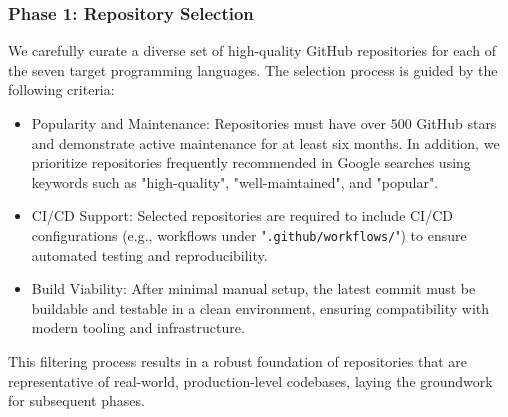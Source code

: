 \documentclass[11pt, a4paper, logo, copyright, nonumbering]{seed}
\begin{document}

\subsubsection{Phase 1: Repository Selection}
\label{sec:phase1_repository_selection}

We carefully curate a diverse set of high-quality GitHub repositories for each of the seven target programming languages. 
The selection process is guided by the following criteria:
\begin{itemize}[leftmargin=*]
    \item Popularity and Maintenance: Repositories must have over $500$ GitHub stars and demonstrate active maintenance for at least six months. 
    In addition, we prioritize repositories frequently recommended in Google searches using keywords such as "high-quality", "well-maintained", and "popular".
    \item CI/CD Support: Selected repositories are required to include CI/CD configurations (e.g., workflows under "\texttt{.github/workflows/}") to ensure automated testing and reproducibility.
    \item Build Viability: After minimal manual setup, the latest commit must be buildable and testable in a clean environment, ensuring compatibility with modern tooling and infrastructure.
\end{itemize}
This filtering process results in a robust foundation of repositories that are representative of real-world, production-level codebases, laying the groundwork for subsequent phases.
\end{document}
